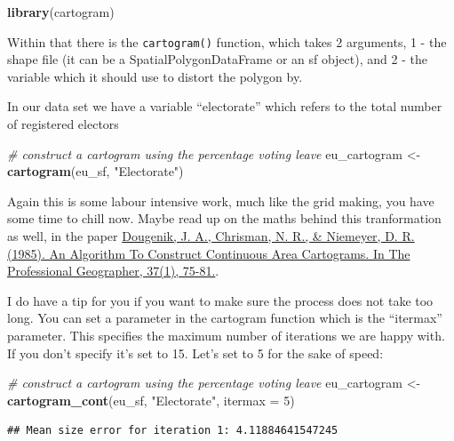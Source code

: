 \documentclass[]{book}
\newenvironment{Shaded}{\begin{snugshade}}{\end{snugshade}}
\newcommand{\CommentTok}[1]{\textcolor[rgb]{0.56,0.35,0.01}{\textit{#1}}}
\newcommand{\DataTypeTok}[1]{\textcolor[rgb]{0.13,0.29,0.53}{#1}}
\newcommand{\DecValTok}[1]{\textcolor[rgb]{0.00,0.00,0.81}{#1}}
\newcommand{\KeywordTok}[1]{\textcolor[rgb]{0.13,0.29,0.53}{\textbf{#1}}}
\newcommand{\NormalTok}[1]{#1}
\newcommand{\StringTok}[1]{\textcolor[rgb]{0.31,0.60,0.02}{#1}}
\begin{document}
\begin{Shaded}
\begin{Highlighting}[]
\KeywordTok{library}\NormalTok{(cartogram)}
\end{Highlighting}
\end{Shaded}

Within that there is the \texttt{cartogram()} function, which takes 2 arguments, 1 - the shape file (it can be a SpatialPolygonDataFrame or an sf object), and 2 - the variable which it should use to distort the polygon by.

In our data set we have a variable ``electorate'' which refers to the total number of registered electors

\begin{Shaded}
\begin{Highlighting}[]
\CommentTok{# construct a cartogram using the percentage voting leave}
\NormalTok{eu_cartogram <-}\StringTok{ }\KeywordTok{cartogram}\NormalTok{(eu_sf, }\StringTok{"Electorate"}\NormalTok{)}
\end{Highlighting}
\end{Shaded}

Again this is some labour intensive work, much like the grid making, you have some time to chill now. Maybe read up on the maths behind this tranformation as well, in the paper \href{https://onlinelibrary.wiley.com/doi/abs/10.1111/j.0033-0124.1985.00075.x}{Dougenik, J. A., Chrisman, N. R., \& Niemeyer, D. R. (1985). An Algorithm To Construct Continuous Area Cartograms. In The Professional Geographer, 37(1), 75-81.}.

I do have a tip for you if you want to make sure the process does not take too long. You can set a parameter in the cartogram function which is the ``itermax'' parameter. This specifies the maximum number of iterations we are happy with. If you don't specify it's set to 15. Let's set to 5 for the sake of speed:

\begin{Shaded}
\begin{Highlighting}[]
\CommentTok{# construct a cartogram using the percentage voting leave}
\NormalTok{eu_cartogram <-}\StringTok{ }\KeywordTok{cartogram_cont}\NormalTok{(eu_sf, }\StringTok{"Electorate"}\NormalTok{, }\DataTypeTok{itermax =} \DecValTok{5}\NormalTok{)}
\end{Highlighting}
\end{Shaded}

\begin{verbatim}
## Mean size error for iteration 1: 4.11884641547245
\end{verbatim}
\end{document}

